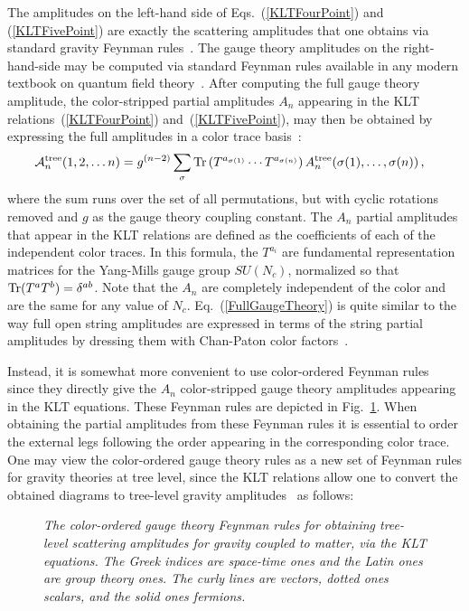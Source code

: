 \documentclass[12pt]{livrev}
\begin{document}
The amplitudes on the left-hand side of Eqs.~(\ref{KLTFourPoint}) and
(\ref{KLTFivePoint}) are exactly the scattering amplitudes that one
obtains via standard gravity Feynman
rules~\cite{DeWitt67A,DeWitt67B,VeltmanGravity}.  The gauge theory
amplitudes on the right-hand-side may be computed via standard Feynman
rules available in any modern textbook on quantum field
theory~\cite{Peskin95,Weinberg95}.  After computing the full gauge
theory amplitude, the color-stripped partial amplitudes $A_n$
appearing in the KLT relations~(\ref{KLTFourPoint})
and~(\ref{KLTFivePoint}), may then be obtained by expressing the
full amplitudes in a color trace
basis~\cite{Berends87,Kosower88,Mangano88,ManganoReview,TasiLance}:
%
\begin{equation}
{\cal A}_n^{\rm tree} (1,2,\ldots n) = 
 g^{(n-2)}  \sum_{\sigma } 
{\rm Tr}\left( T^{a_{\sigma(1)}} 
\cdots  T^{a_{\sigma(n)}} \right)
 A_n^{\rm tree}(\sigma(1), \ldots, \sigma(n)) \,, \hskip .3 cm 
\label{FullGaugeTheory}
\end{equation}
%
where the sum runs over the set of all permutations, but with cyclic
rotations removed and $g$ as the gauge theory coupling constant.  The
$A_n$ partial amplitudes that appear in the KLT relations are defined
as the coefficients of each of the independent color traces. In this
formula, the $T^{a_i}$ are fundamental representation matrices for the
Yang-Mills gauge group $SU(N_c)$, normalized so that ${\rm Tr}(T^aT^b)
= \delta^{ab}$. Note that the $A_n$ are completely independent of the
color and are the same for any value of $N_c$.
Eq.~(\ref{FullGaugeTheory}) is quite similar to the way full open
string amplitudes are expressed in terms of the string partial
amplitudes by dressing them with Chan-Paton color
factors~\cite{ChanPaton}.

Instead, it is somewhat more convenient to use color-ordered Feynman
rules~\cite{ManganoReview,TasiLance,Review} since they directly give
the $A_n$ color-stripped gauge theory amplitudes appearing in the KLT
equations.  These Feynman rules are depicted in
Fig.~\ref{figure:Rules}.  When obtaining the partial amplitudes from
these Feynman rules it is essential to order the external legs
following the order appearing in the corresponding color trace.
One may view the color-ordered gauge theory rules as a new set of
Feynman rules for gravity theories at tree level, since the KLT
relations allow one to convert the obtained diagrams to tree-level
gravity amplitudes~\cite{Square} as follows:

\begin{figure}[h]
  \def\epsfsize#1#2{0.8#1} \centerline{}
  \caption{\it The color-ordered gauge theory Feynman rules for
  obtaining tree-level scattering amplitudes for gravity coupled to matter, via
  the KLT equations. The Greek indices are space-time ones and the
  Latin ones are group theory ones.  The curly lines are vectors,
  dotted ones scalars, and the solid ones fermions.}
  \label{figure:Rules}
\end{figure}
\end{document}
